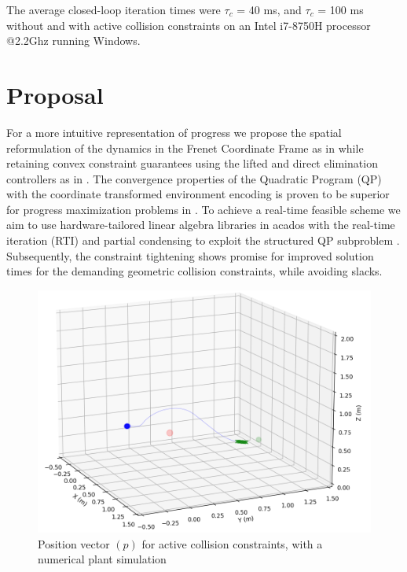 \documentclass[conference]{IEEEtran}
\begin{document}
The average closed-loop iteration times were $\tau_{c}$ = 40 ms, and $\tau_{c}$ = 100 ms without and with active collision constraints on an Intel i7-8750H processor @2.2Ghz running Windows.
\section{Proposal}\label{Section6}
\par For a more intuitive representation of progress we propose the spatial reformulation of the dynamics in the Frenet Coordinate Frame as in \cite{arrizabalaga_towards_2022} while retaining convex constraint guarantees using the lifted and direct elimination controllers as in \cite{reiter_frenet-cartesian_2023}. The convergence properties of the Quadratic Program (QP) with the coordinate transformed environment encoding is proven to be superior for progress maximization problems in \cite{werling_invariant_2010}.
To achieve a real-time feasible scheme we aim to use hardware-tailored linear algebra libraries \cite{frison_blasfeo_2018} in acados \cite{verschueren_acados_2020} with the real-time iteration \cite{gros_linear_2020} (RTI) and partial condensing to exploit the structured QP subproblem \cite{frison_hpipm_2020}.
Subsequently, the constraint tightening \cite{reiter_progressive_nodate} shows promise for improved solution times for the demanding geometric collision constraints, while avoiding slacks.
\begin{figure}[t!]
	\centerline{\includegraphics[scale = 0.4]{figures/Screenshot_OLwO_ST.png} }
	\caption{Position vector $(p)$ for active collision constraints, with a numerical plant simulation}
	\label{Fig4}
\end{figure}


\end{document}
